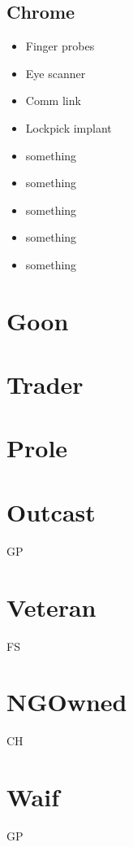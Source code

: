 \documentclass{tufte-book}
\begin{document}
\subsection{Chrome}
\begin{multicols}{3}
\begin{itemize}
\item Finger probes
\item Eye scanner
\item Comm link
\item Lockpick implant
\item something
\item something
\item something
\item something
\item something
\end{itemize}
\end{multicols}


\section{Goon} \label{sec:Goon}

\section{Trader} \label{sec:Trader}

\section{Prole} \label{sec:Prole}

\section{Outcast} \label{sec:Outcast}
GP

\section{Veteran} \label{sec:Veteran}
FS

\section{NGOwned} \label{sec:NGOwned}
CH

\section{Waif} \label{sec:Waif}
GP
\end{document}
